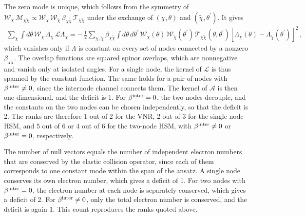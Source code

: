 \documentclass[aps,prb,onecolumn,nofootinbib,citeautoscript,10pt]{revtex4-2}
\begin{document}
The zero mode is unique, which follows from the symmetry of $\mathcal W_\chi\,\mathcal M_{\chi\tilde\chi}\propto\mathcal W_\chi\,\mathcal W_{\tilde\chi}\,\beta_{\chi\tilde\chi}\,\mathcal T_{\chi\tilde\chi}$ under the exchange of $(\chi,\theta)$ and $(\tilde\chi,\theta^\prime)$. It gives
\begin{align}
\sum_\chi\int d\theta\,\mathcal W_\chi\,\Lambda_\chi\,\mathcal L\Lambda_\chi
= -\,\frac{1}{2}\sum_{\chi,\tilde\chi}\beta_{\chi\tilde\chi}\int d\theta\,d\theta^\prime\,\mathcal W_\chi(\theta)\,\mathcal W_{\tilde\chi}(\theta^\prime)\,\mathcal T_{\chi\tilde\chi}(\theta,\theta^\prime)\left[\Lambda_\chi(\theta)-\Lambda_{\tilde\chi}(\theta^\prime)\right]^2 \,,
\end{align}
which vanishes only if $\Lambda$ is constant on every set of nodes connected by a nonzero $\beta_{\chi\tilde\chi}$. The overlap functions are squared spinor overlaps, which are nonnegative and vanish only at isolated angles. For a single node, the kernel of $\mathcal L$ is thus spanned by the constant function. The same holds for a pair of nodes with $\beta^{\rm inter}\neq0$, since the internode channel connects them. The kernel of $\mathcal A$ is then one-dimensional, and the deficit is 1. For $\beta^{\rm inter}=0$, the two nodes decouple, and the constants on the two nodes can be chosen independently, so that the deficit is 2. The ranks are therefore $1$ out of $2$ for the VNR, $2$ out of $3$ for the single-node HSM, and $5$ out of $6$ or $4$ out of $6$ for the two-node HSM, with $\beta^{\rm inter}\neq0$ or $\beta^{\rm inter}=0$, respectively.

The number of null vectors equals the number of independent electron numbers that are conserved by the elastic collision operator, since each of them corresponds to one constant mode within the span of the ansatz. A single node conserves its own electron number, which gives a deficit of 1. For two nodes with $\beta^{\rm inter}=0$, the electron number at each node is separately conserved, which gives a deficit of 2. For $\beta^{\rm inter}\neq0$, only the total electron number is conserved, and the deficit is again 1. This count reproduces the ranks quoted above.
\end{document}
